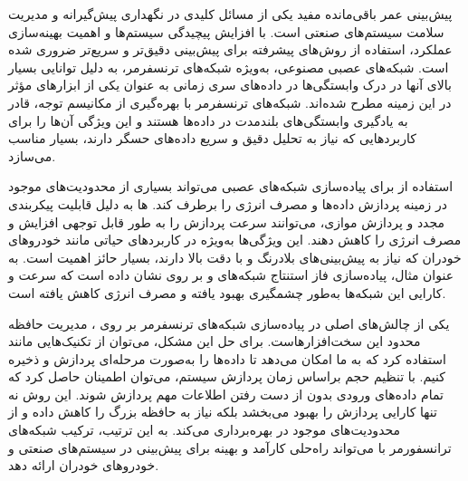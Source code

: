 
 \label{conclusion}



پیش‌بینی عمر باقی‌مانده مفید یکی از مسائل کلیدی در نگهداری پیش‌گیرانه و مدیریت سلامت سیستم‌های صنعتی است. با افزایش پیچیدگی سیستم‌ها و اهمیت بهینه‌سازی عملکرد، استفاده از روش‌های پیشرفته برای پیش‌بینی دقیق‌تر و سریع‌تر  ضروری شده است. شبکه‌های عصبی مصنوعی، به‌ویژه شبکه‌های ترنسفرمر، به دلیل توانایی بسیار بالای آنها در درک وابستگی‌ها در داده‌های سری زمانی به عنوان یکی از ابزارهای مؤثر در این زمینه مطرح شده‌اند. شبکه‌های ترنسفرمر با بهره‌گیری از مکانیسم توجه، قادر به یادگیری وابستگی‌های بلندمدت در داده‌ها هستند و این ویژگی آن‌ها را برای کاربردهایی که نیاز به تحلیل دقیق و سریع داده‌های حسگر دارند، بسیار مناسب می‌سازد.


استفاده از  برای پیاده‌سازی شبکه‌های عصبی می‌تواند بسیاری از محدودیت‌های موجود در زمینه پردازش داده‌ها و مصرف انرژی را برطرف کند. ‌ها به دلیل قابلیت پیکربندی مجدد و پردازش موازی، می‌توانند سرعت پردازش را به طور قابل توجهی افزایش و مصرف انرژی را کاهش دهند. این ویژگی‌ها به‌ویژه در کاربردهای حیاتی مانند خودروهای خودران که نیاز به پیش‌بینی‌های بلادرنگ و با دقت بالا دارند، بسیار حائز اهمیت است. به عنوان مثال، پیاده‌سازی فاز استنتاج شبکه‌های  و  بر روی  نشان داده است که سرعت و کارایی این شبکه‌ها به‌طور چشمگیری بهبود یافته و مصرف انرژی کاهش یافته است.


یکی از چالش‌های اصلی در پیاده‌سازی شبکه‌های ترنسفرمر بر روی ، مدیریت حافظه محدود این سخت‌افزارهاست. برای حل این مشکل، می‌توان از تکنیک‌هایی مانند  استفاده کرد که به ما امکان می‌دهد تا داده‌ها را به‌صورت مرحله‌ای پردازش و ذخیره کنیم. با تنظیم حجم  براساس زمان پردازش سیستم، می‌توان اطمینان حاصل کرد که تمام داده‌های ورودی بدون از دست رفتن اطلاعات مهم پردازش شوند. این روش نه تنها کارایی پردازش را بهبود می‌بخشد بلکه نیاز به حافظه بزرگ را کاهش داده و از محدودیت‌های موجود در  بهره‌برداری می‌کند. به این ترتیب، ترکیب شبکه‌های ترانسفورمر با  می‌تواند راه‌حلی کارآمد و بهینه برای پیش‌بینی  در سیستم‌های صنعتی و خودروهای خودران ارائه دهد.





%
%
%
